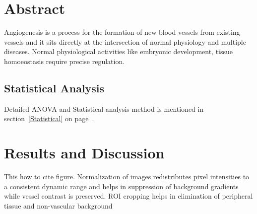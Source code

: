 \newpage
\null
\thispagestyle{empty}
\newpage

\vspace*{\fill}
\begin{center}
\end{center}
\vspace*{\fill}
\clearpage

\section{Abstract}
Angiogenesis is a process for the formation of new blood vessels from existing vessels and it sits directly at the intersection of normal physiology and multiple diseases.
Normal physiological activities like embryonic development, tissue homoeostasis require precise regulation.


\subsection{Statistical Analysis}	
Detailed ANOVA and Statistical analysis method is mentioned in section~\ref{Statistical} on page~\pageref{Statistical}.
\section{Results and Discussion}

This how to cite figure. %
Normalization of images redistributes pixel intensities to a consistent dynamic range and helps in suppression of background gradients while vessel contrast is preserved.
ROI cropping helps in elimination of peripheral tissue and non-vascular background 
\clearpage
\clearpage

